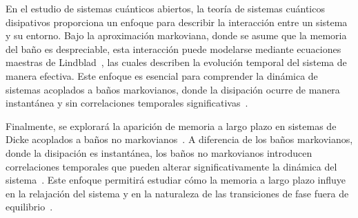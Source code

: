 \documentclass[onecolumn,notitlepage,letterpaper,aps,pra,12pt]{article}
\numberwithin{equation}{section}
\begin{document}
En el estudio de sistemas cuánticos abiertos, la teoría de sistemas cuánticos disipativos proporciona un enfoque para describir la interacción entre un sistema y su entorno. Bajo la aproximación markoviana, donde se asume que la memoria del baño es despreciable, esta interacción puede modelarse mediante ecuaciones maestras de Lindblad~\cite{breuer2003,Lindblad1976}, las cuales describen la evolución temporal del sistema de manera efectiva. Este enfoque es esencial para comprender la dinámica de sistemas acoplados a baños markovianos, donde la disipación ocurre de manera instantánea y sin correlaciones temporales significativas~\cite{weiss2012}.

Finalmente, se explorará la aparición de memoria a largo plazo en sistemas de Dicke acoplados a baños no markovianos~\cite{zhu2019,lundgren2020,fiorelli2020}. A diferencia de los baños markovianos, donde la disipación es instantánea, los baños no markovianos introducen correlaciones temporales que pueden alterar significativamente la dinámica del sistema~\cite{orazio2016}. Este enfoque permitirá estudiar cómo la memoria a largo plazo influye en la relajación del sistema y en la naturaleza de las transiciones de fase fuera de equilibrio~\cite{lundgren2020}. %

\end{document}
